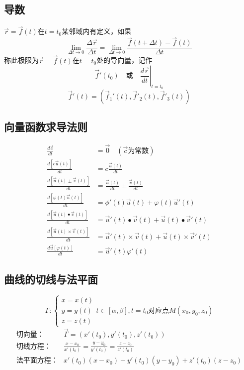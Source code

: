 \subsection{导数}
$\overrightarrow{r}=\overrightarrow{f}(t)$在$t=t_0$某邻域内有定义，如果
$$\lim\limits_{\Delta t\to 0}\frac{\Delta\overrightarrow{r}}{\Delta t}=\lim\limits_{\Delta t\to 0}\frac{\overrightarrow{f}(t+\Delta t)-\overrightarrow{f}(t)}{\Delta t}$$
称此极限为$\overrightarrow{r}=\overrightarrow{f}(t)$在$t=t_0$处的导向量，记作
$$\overrightarrow{f}'(t_0)\quad\mbox{或}\quad \left.\frac{d\overrightarrow{r}}{dt}\right|_{t=t_0}$$
$$\overrightarrow{f}'(t)=\left(\overrightarrow{f}_1'(t),\overrightarrow{f}'_2(t),\overrightarrow{f}'_3(t) \right)$$
\subsection{向量函数求导法则}
\begin{align}
	\frac{d\overrightarrow{c}}{dt}&=\overrightarrow{0}\quad(\overrightarrow{c}\mbox{为常数})\\
	\frac{d\left[c\overrightarrow{u}(t)\right]}{dt}&=c\frac{\overrightarrow{u}(t)}{dt}\\
	\frac{d\left[\overrightarrow{u}(t)\pm\overrightarrow{v}(t)\right]}{dt}&=\frac{\overrightarrow{u}(t)}{dt}\pm\frac{\overrightarrow{v}(t)}{dt}\\
	\frac{d\left[\varphi(t)\overrightarrow{u}(t)\right]}{dt}&=\phi'(t)\overrightarrow{u}(t)+\varphi(t)\overrightarrow{u}'(t)\\
	\frac{d\left[\overrightarrow{u}(t)\bullet\overrightarrow{v}(t)\right]}{dt}&=\overrightarrow{u}'(t)\bullet\overrightarrow{v}(t)+\overrightarrow{u}(t)\bullet\overrightarrow{v}'(t)\\
	\frac{d\left[\overrightarrow{u}(t)\times\overrightarrow{v}(t)\right]}{dt}&=\overrightarrow{u}'(t)\times\overrightarrow{v}(t)+\overrightarrow{u}(t)\times\overrightarrow{v}'(t)\\
	\frac{d\overrightarrow{u}[\varphi(t)]}{dt}&=\overrightarrow{u}'(t)\varphi'(t)
\end{align}
\subsection{曲线的切线与法平面}
$$\Gamma:\begin{cases}
	x=x(t)\\
	y=y(t)\\
	z=z(t)
\end{cases}t\in[\alpha,\beta],t=t_0\mbox{对应点}M(x_0,y_0,z_0)$$
\begin{align*}
	\mbox{切向量：}&\overrightarrow{\Gamma}=(x'(t_0),y'(t_0),z'(t_0))\\
	\mbox{切线方程：}&\frac{x-x_0}{x'(t_0)}=\frac{y-y_0}{y'(t_0)}=\frac{z-z_0}{z'(t_0)}\\
	\mbox{法平面方程：}&x'(t_0)(x-x_0)+y'(t_0)(y-y_0)+z'(t_0)(z-z_0)
\end{align*}
